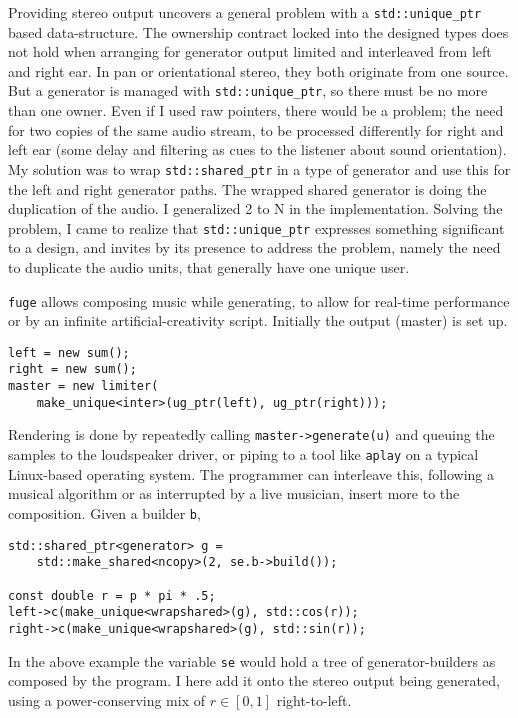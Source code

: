 \documentclass{article}
\begin{document}
Providing stereo output uncovers a general problem with a
\verb|std::unique_ptr| based data-structure.
The ownership contract locked into the designed types
does not hold when arranging for generator
output limited and interleaved from left and right ear.
In pan or orientational stereo, they both originate from one source.
But a generator is managed with \verb|std::unique_ptr|,
so there must be no more than one owner.
Even if I used raw pointers, there would be a problem; the need for two copies
of the same audio stream, to be processed differently for right and left
ear (some delay and filtering as cues to the listener about sound orientation).
My solution was to wrap \verb|std::shared_ptr| in a type of generator
and use this for the left and right generator paths.
The wrapped shared generator is doing the duplication of the audio.
I generalized 2 to N in the implementation.
Solving the problem, I came to realize that \verb|std::unique_ptr|
expresses something significant to a design,
and invites by its presence to address the problem, namely
the need to duplicate the audio units, that generally have one unique user.

\texttt{fuge} allows composing music while generating, to allow for real-time performance
or by an infinite artificial-creativity script.
Initially the output (master) is set up.

\begin{verbatim}
left = new sum();
right = new sum();
master = new limiter(
    make_unique<inter>(ug_ptr(left), ug_ptr(right)));  
\end{verbatim}

Rendering is done by repeatedly calling \verb|master->generate(u)|
and queuing the samples to the loudspeaker driver, or piping to a tool like
\texttt{aplay} on a typical Linux-based operating system.
The programmer can interleave this, following a musical algorithm or
as interrupted by a live musician, insert more to the composition.
Given a builder \verb|b|,

\begin{verbatim}
std::shared_ptr<generator> g =
    std::make_shared<ncopy>(2, se.b->build());

const double r = p * pi * .5;
left->c(make_unique<wrapshared>(g), std::cos(r));
right->c(make_unique<wrapshared>(g), std::sin(r)); 
\end{verbatim}

In the above example the variable \verb|se| would
hold a tree of generator-builders as composed by the program.
I here add it onto the stereo output being generated, using a
power-conserving mix of $r \in \left[0,1\right]$
right-to-left.



\end{document}
